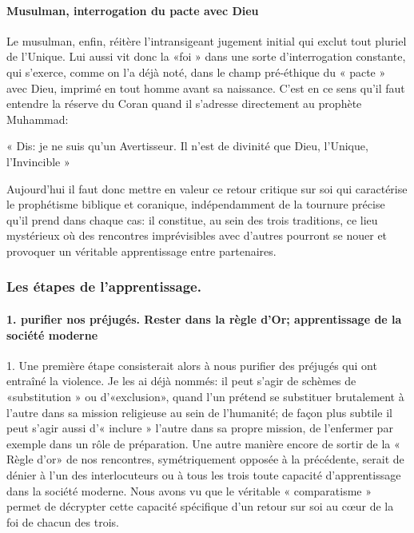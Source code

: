 \paragraph{Musulman, interrogation du pacte avec Dieu }
Le musulman, enfin, réitère l'intransigeant jugement initial qui exclut tout pluriel de l'Unique. Lui aussi vit donc la «foi » dans une sorte d'interrogation constante, qui s'exerce, comme on l'a déjà noté, dans le champ pré-éthique du « pacte » avec Dieu, imprimé en tout homme avant sa naissance. C'est en ce sens qu'il faut entendre la réserve du Coran quand il s'adresse directement au prophète Muhammad: 
\begin{Ecriture}[sourate 38, 65]
    « Dis: je ne suis qu'un Avertisseur. Il n'est de divinité que Dieu, l'Unique, l'Invincible » 
\end{Ecriture}
Aujourd'hui il faut donc mettre en valeur ce retour critique sur soi qui caractérise le prophétisme biblique et coranique, indépendamment de la tournure précise qu'il prend dans chaque cas: il constitue, au sein des trois traditions, ce lieu mystérieux où des rencontres imprévisibles avec d'autres pourront se nouer et provoquer un véritable apprentissage entre partenaires.

\subsubsection{Les étapes de l'apprentissage.}

\paragraph{1. purifier nos préjugés. Rester dans la règle d'Or; apprentissage de la société moderne} 
1. Une première étape consisterait alors à nous purifier des préjugés qui ont entraîné la violence. Je les ai déjà nommés: il peut s'agir de schèmes de «substitution » ou d'«exclusion», quand l'un prétend se substituer brutalement à l'autre dans sa mission religieuse au sein de l'humanité; de façon plus subtile il peut s'agir aussi d'« inclure » l'autre dans sa propre mission, de l'enfermer par exemple dans un rôle de préparation. Une autre manière encore de sortir de la « Règle d'or» de nos rencontres, symétriquement opposée à la précédente, serait de dénier à l'un des interlocuteurs ou à tous les trois toute capacité d'apprentissage dans la société moderne. Nous avons vu que le véritable « comparatisme » permet de décrypter cette capacité spécifique d'un retour sur soi au cœur de la foi de chacun des trois.

